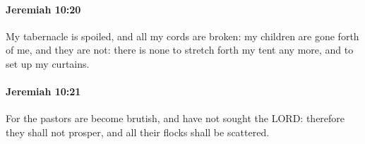 		\paragraph{Jeremiah 10:20} %
			\label{JEREMIAH-10-20}

			My tabernacle is spoiled, and all my cords are broken: my children are gone forth of me, and they are not: there is none to stretch forth my tent any more, and to set up my curtains.


		\paragraph{Jeremiah 10:21} %
			\label{JEREMIAH-10-21}

			For the pastors are become brutish, and have not sought the LORD: therefore they shall not prosper, and all their flocks shall be scattered.



